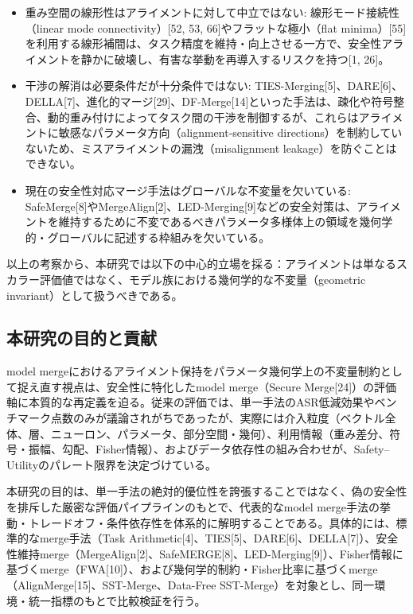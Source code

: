 \documentclass{article}
\begin{document}
\begin{itemize}
\item 重み空間の線形性はアライメントに対して中立ではない: 線形モード接続性（linear mode connectivity）[52, 53, 66]やフラットな極小（flat minima）[55]を利用する線形補間は、タスク精度を維持・向上させる一方で、安全性アライメントを静かに破壊し、有害な挙動を再導入するリスクを持つ[1, 26]。
\item 干渉の解消は必要条件だが十分条件ではない: TIES-Merging[5]、DARE[6]、DELLA[7]、進化的マージ[29]、DF-Merge[14]といった手法は、疎化や符号整合、動的重み付けによってタスク間の干渉を制御するが、これらはアライメントに敏感なパラメータ方向（alignment-sensitive directions）を制約していないため、ミスアライメントの漏洩（misalignment leakage）を防ぐことはできない。
\item 現在の安全性対応マージ手法はグローバルな不変量を欠いている: SafeMerge[8]やMergeAlign[2]、LED-Merging[9]などの安全対策は、アライメントを維持するために不変であるべきパラメータ多様体上の領域を幾何学的・グローバルに記述する枠組みを欠いている。
\end{itemize}

以上の考察から、本研究では以下の中心的立場を採る：アライメントは単なるスカラー評価値ではなく、モデル族における幾何学的な不変量（geometric invariant）として扱うべきである。

\subsection{本研究の目的と貢献}

model mergeにおけるアライメント保持をパラメータ幾何学上の不変量制約として捉え直す視点は、安全性に特化したmodel merge（Secure Merge[24]）の評価軸に本質的な再定義を迫る。従来の評価では、単一手法のASR低減効果やベンチマーク点数のみが議論されがちであったが、実際には介入粒度（ベクトル全体、層、ニューロン、パラメータ、部分空間・幾何）、利用情報（重み差分、符号・振幅、勾配、Fisher情報）、およびデータ依存性の組み合わせが、Safety--Utilityのパレート限界を決定づけている。

本研究の目的は、単一手法の絶対的優位性を誇張することではなく、偽の安全性を排斥した厳密な評価パイプラインのもとで、代表的なmodel merge手法の挙動・トレードオフ・条件依存性を体系的に解明することである。具体的には、標準的なmerge手法（Task Arithmetic[4]、TIES[5]、DARE[6]、DELLA[7]）、安全性維持merge（MergeAlign[2]、SafeMERGE[8]、LED-Merging[9]）、Fisher情報に基づくmerge（FWA[10]）、および幾何学的制約・Fisher比率に基づくmerge（AlignMerge[15]、SST-Merge、Data-Free SST-Merge）を対象とし、同一環境・統一指標のもとで比較検証を行う。
\end{document}

